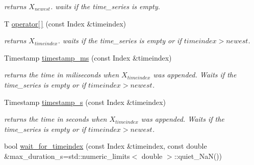 \begin{DoxyCompactItemize}
\begin{DoxyCompactList}\small\item\em returns $ X_{newest} $. waits if the time\+\_\+series is empty. \end{DoxyCompactList}\item 
T \hyperlink{classtime__series_1_1internal_1_1TimeSeriesBase_aa7267458e4fadff7314037a4bd1d53bb}{operator\mbox{[}$\,$\mbox{]}} (const Index \&timeindex)\hypertarget{classtime__series_1_1internal_1_1TimeSeriesBase_aa7267458e4fadff7314037a4bd1d53bb}{}\label{classtime__series_1_1internal_1_1TimeSeriesBase_aa7267458e4fadff7314037a4bd1d53bb}

\begin{DoxyCompactList}\small\item\em returns $ X_{timeindex} $. waits if the time\+\_\+series is empty or if $timeindex > newest $. \end{DoxyCompactList}\item 
Timestamp \hyperlink{classtime__series_1_1internal_1_1TimeSeriesBase_a1e4c7ca710bb14e7dce57a1dd9c4f929}{timestamp\+\_\+ms} (const Index \&timeindex)\hypertarget{classtime__series_1_1internal_1_1TimeSeriesBase_a1e4c7ca710bb14e7dce57a1dd9c4f929}{}\label{classtime__series_1_1internal_1_1TimeSeriesBase_a1e4c7ca710bb14e7dce57a1dd9c4f929}

\begin{DoxyCompactList}\small\item\em returns the time in miliseconds when $ X_{timeindex} $ was appended. Waits if the time\+\_\+series is empty or if $timeindex > newest $. \end{DoxyCompactList}\item 
Timestamp \hyperlink{classtime__series_1_1internal_1_1TimeSeriesBase_aacca694af4c53fa4ae9cd3593c12bf58}{timestamp\+\_\+s} (const Index \&timeindex)\hypertarget{classtime__series_1_1internal_1_1TimeSeriesBase_aacca694af4c53fa4ae9cd3593c12bf58}{}\label{classtime__series_1_1internal_1_1TimeSeriesBase_aacca694af4c53fa4ae9cd3593c12bf58}

\begin{DoxyCompactList}\small\item\em returns the time in seconds when $ X_{timeindex} $ was appended. Waits if the time\+\_\+series is empty or if $timeindex > newest $. \end{DoxyCompactList}\item 
bool \hyperlink{classtime__series_1_1internal_1_1TimeSeriesBase_a5651e522492514408e38a5b99e144a06}{wait\+\_\+for\+\_\+timeindex} (const Index \&timeindex, const double \&max\+\_\+duration\+\_\+s=std\+::numeric\+\_\+limits$<$ double $>$\+::quiet\+\_\+\+NaN())\hypertarget{classtime__series_1_1internal_1_1TimeSeriesBase_a5651e522492514408e38a5b99e144a06}{}\label{classtime__series_1_1internal_1_1TimeSeriesBase_a5651e522492514408e38a5b99e144a06}


\end{DoxyCompactItemize}

